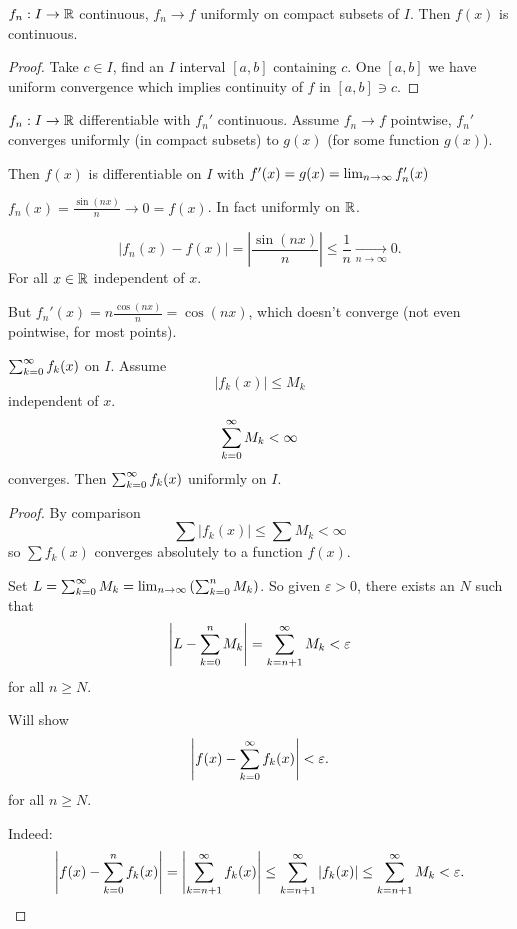 \documentclass[10pt, a4paper]{article}
\begin{document}
\begin{theorem}
    $f_n : I \to \R$ continuous,
    $f_n \to f$ uniformly on compact subsets of $I$.
    Then $f(x)$ is continuous.

    \begin{proof}
        Take $c \in I$,
        find an $I$ interval $[a, b]$ containing $c$.
        One $[a, b]$ we have uniform convergence which implies continuity of $f$ in $[a, b] \ni c$.
    \end{proof}
\end{theorem}

\begin{theorem}
    $f_n : I \to \R$ differentiable with $f_n'$ continuous.
    Assume $f_n \to f$ pointwise,
    $f_n'$ converges uniformly
    (in compact subsets)
    to $g(x)$
    (for some function $g(x)$).

    Then $f(x)$ is differentiable on $I$ with $f'(x) = g(x) = \liminfty f_n'(x)$
\end{theorem}

\begin{example}
    $f_n(x) = \frac{\sin(nx)}{n} \to 0 = f(x)$.
    In fact uniformly on $\R$.

    \[
    |f_n(x) - f(x)| = \left|\frac{\sin(nx)}{n}\right| \leq \frac{1}{n} \xrightarrow[n \to \infty]{} 0.
    \]
    For all $x \in \R$ independent of $x$.

    But $f_n'(x) = n\frac{\cos(nx)}{n} = \cos(nx)$,
    which doesn't converge
    (not even pointwise,
    for most points).
\end{example}

\begin{theorem}
    $\infsumo f_k(x)$ on $I$.
    Assume
    \[
    |f_k(x)| \leq M_k
    \]
    independent of $x$.
    \[
    \infsumo M_k < \infty
    \]
    converges.
    Then $\infsumo f_k(x)$ uniformly on $I$.

    \begin{proof}
        By comparison
        \[
        \sum|f_k(x)| \leq \sum M_k < \infty
        \]
        so $\sum f_k(x)$ converges absolutely to a function $f(x)$.

        Set $L = \infsumo M_k = \liminfty\left(\sum_{k = 0}^{n}M_k\right)$.
        So given $\varepsilon > 0$,
        there exists an $N$ such that
        \[
        \left|L - \sum_{k = 0}^{n}M_k\right| = \infsum[k = n + 1]M_k < \varepsilon
        \]
        for all $n \geq N$.

        Will show
        \[
        \left|f(x) - \infsumo f_k(x)\right| < \varepsilon.
        \]
        for all $n \geq N$.

        Indeed:
        \[
        \left|f(x) - \sum_{k = 0}^{n}f_k(x)\right| = \left|\infsum[k = n + 1]f_k(x)\right| \leq \infsum[k = n + 1]|f_k(x)| \leq \infsum[k = n + 1]M_k < \varepsilon.
        \]
    \end{proof}
\end{theorem}
\end{document}
